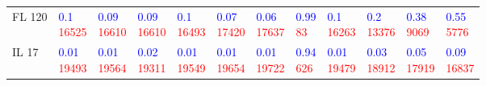 \begin{tabular}{llllllllllll}
FL 120 & \makecell{\textcolor{blue}{0.1} \\ \textcolor{red}{16525}} & \makecell{\textcolor{blue}{0.09} \\ \textcolor{red}{16610}} & \makecell{\textcolor{blue}{0.09} \\ \textcolor{red}{16610}} & \makecell{\textcolor{blue}{0.1} \\ \textcolor{red}{16493}} & \makecell{\textcolor{blue}{0.07} \\ \textcolor{red}{17420}} & \makecell{\textcolor{blue}{0.06} \\ \textcolor{red}{17637}} & \makecell{\textcolor{blue}{0.99} \\ \textcolor{red}{83}} & \makecell{\textcolor{blue}{0.1} \\ \textcolor{red}{16263}} & \makecell{\textcolor{blue}{0.2} \\ \textcolor{red}{13376}} & \makecell{\textcolor{blue}{0.38} \\ \textcolor{red}{9069}} & \makecell{\textcolor{blue}{0.55} \\ \textcolor{red}{5776}} \\
IL 17 & \makecell{\textcolor{blue}{0.01} \\ \textcolor{red}{19493}} & \makecell{\textcolor{blue}{0.01} \\ \textcolor{red}{19564}} & \makecell{\textcolor{blue}{0.02} \\ \textcolor{red}{19311}} & \makecell{\textcolor{blue}{0.01} \\ \textcolor{red}{19549}} & \makecell{\textcolor{blue}{0.01} \\ \textcolor{red}{19654}} & \makecell{\textcolor{blue}{0.01} \\ \textcolor{red}{19722}} & \makecell{\textcolor{blue}{0.94} \\ \textcolor{red}{626}} & \makecell{\textcolor{blue}{0.01} \\ \textcolor{red}{19479}} & \makecell{\textcolor{blue}{0.03} \\ \textcolor{red}{18912}} & \makecell{\textcolor{blue}{0.05} \\ \textcolor{red}{17919}} & \makecell{\textcolor{blue}{0.09} \\ \textcolor{red}{16837}} \\

\end{tabular}
